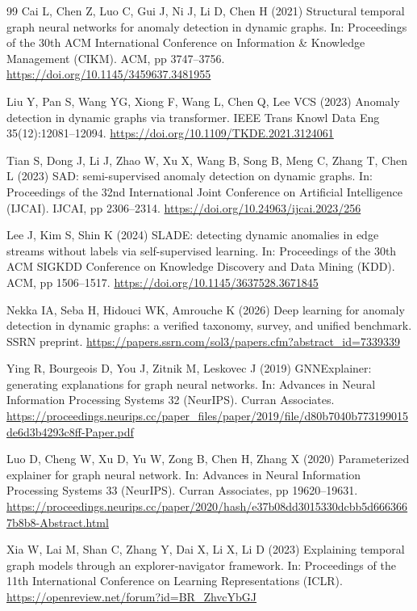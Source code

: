 \documentclass[pdflatex,sn-basic]{sn-jnl}
\theoremstyle{definition}
\theoremstyle{plain}
\begin{document}
\begin{thebibliography}{99}
Cai L, Chen Z, Luo C, Gui J, Ni J, Li D, Chen H (2021) Structural temporal graph neural networks for anomaly detection in dynamic graphs. In: Proceedings of the 30th ACM International Conference on Information \& Knowledge Management (CIKM). ACM, pp 3747--3756. \url{https://doi.org/10.1145/3459637.3481955}

Liu Y, Pan S, Wang YG, Xiong F, Wang L, Chen Q, Lee VCS (2023) Anomaly detection in dynamic graphs via transformer. IEEE Trans Knowl Data Eng 35(12):12081--12094. \url{https://doi.org/10.1109/TKDE.2021.3124061}

Tian S, Dong J, Li J, Zhao W, Xu X, Wang B, Song B, Meng C, Zhang T, Chen L (2023) SAD: semi-supervised anomaly detection on dynamic graphs. In: Proceedings of the 32nd International Joint Conference on Artificial Intelligence (IJCAI). IJCAI, pp 2306--2314. \url{https://doi.org/10.24963/ijcai.2023/256}

Lee J, Kim S, Shin K (2024) SLADE: detecting dynamic anomalies in edge streams without labels via self-supervised learning. In: Proceedings of the 30th ACM SIGKDD Conference on Knowledge Discovery and Data Mining (KDD). ACM, pp 1506--1517. \url{https://doi.org/10.1145/3637528.3671845}

Nekka IA, Seba H, Hidouci WK, Amrouche K (2026) Deep learning for anomaly detection in dynamic graphs: a verified taxonomy, survey, and unified benchmark. SSRN preprint. \url{https://papers.ssrn.com/sol3/papers.cfm?abstract_id=7339339}

Ying R, Bourgeois D, You J, Zitnik M, Leskovec J (2019) GNNExplainer: generating explanations for graph neural networks. In: Advances in Neural Information Processing Systems 32 (NeurIPS). Curran Associates. \url{https://proceedings.neurips.cc/paper_files/paper/2019/file/d80b7040b773199015de6d3b4293c8ff-Paper.pdf}

Luo D, Cheng W, Xu D, Yu W, Zong B, Chen H, Zhang X (2020) Parameterized explainer for graph neural network. In: Advances in Neural Information Processing Systems 33 (NeurIPS). Curran Associates, pp 19620--19631. \url{https://proceedings.neurips.cc/paper/2020/hash/e37b08dd3015330dcbb5d6663667b8b8-Abstract.html}

Xia W, Lai M, Shan C, Zhang Y, Dai X, Li X, Li D (2023) Explaining temporal graph models through an explorer-navigator framework. In: Proceedings of the 11th International Conference on Learning Representations (ICLR). \url{https://openreview.net/forum?id=BR_ZhvcYbGJ}


\end{thebibliography}
\end{document}
